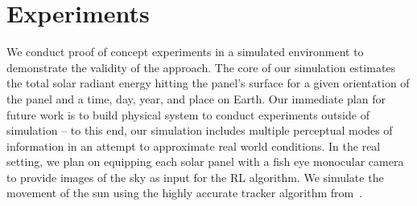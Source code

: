 \documentclass[11pt]{article}
\newcommand{\dnote}[1]{\textcolor{blue}{Dave: #1}}
\begin{document}


\section{Experiments}

We conduct proof of concept experiments in a simulated environment to demonstrate the validity of the approach. The core of our simulation estimates the total solar radiant energy hitting the panel's surface for a given orientation of the panel and a time, day, year, and place on Earth. Our immediate plan for future work is to build physical system to conduct experiments outside of simulation -- to this end, our simulation includes multiple perceptual modes of information in an attempt to approximate real world conditions. In the real setting, we plan on equipping each solar panel with a fish eye monocular camera to provide images of the sky as input for the RL algorithm. We simulate the movement of the sun using the highly accurate tracker algorithm from~\citet{reda2004solar}.%
\end{document}
